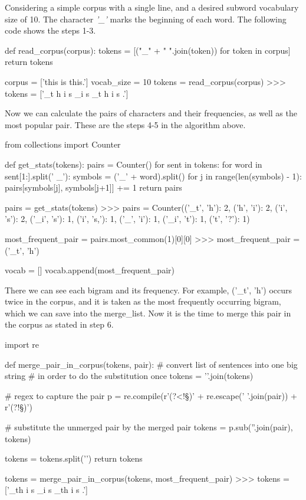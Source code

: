Considering a simple corpus with a single line, and a desired subword vocabulary size of 10. The character \emph{'\_'} marks the beginning of each word. The following code shows the steps 1-3.

\begin{python}
def read_corpus(corpus):
    tokens = [("_" + " ".join(token)) for token in corpus]
    return tokens

corpus = ['this is this.']
vocab_size = 10
tokens = read_corpus(corpus)
>>> tokens = ['_t h i s _i s _t h i s .']
\end{python}

Now we can calculate the pairs of characters and their frequencies, as well as the most popular pair. These are the steps 4-5 in the algorithm above.

\begin{python}
from collections import Counter

def get_stats(tokens):
    pairs = Counter()
    for sent in tokens:
        for word in sent[1:].split(' _'):
            symbols = ('_' + word).split()
            for j in range(len(symbols) - 1):
                pairs[symbols[j], symbols[j+1]] += 1
    return pairs

pairs = get_stats(tokens)
>>> pairs = Counter({('_t', 'h'): 2, ('h', 'i'): 2, ('i', 's'): 2, 
                    ('_i', 's'): 1, ('i', 's,'): 1, ('_', 'i'): 1, 
                    ('_i', 't'): 1, ('t', '?'): 1})

most_frequent_pair = pairs.most_common(1)[0][0]
>>> most_frequent_pair = ('_t', 'h')

vocab = []
vocab.append(most_frequent_pair)
\end{python}

There we can see each bigram and its frequency. For example, ('\_t', 'h') occurs twice in the corpus, and it is taken as the most frequently occurring bigram, which we can save into the merge\_list. Now it is the time to merge this pair in the corpus as stated in step 6.

\begin{python}
import re

def merge_pair_in_corpus(tokens, pair):
    # convert list of sentences into one big string
    # in order to do the substitution once
    tokens = '\n'.join(tokens)

    # regex to capture the pair
    p = re.compile(r'(?<!\S)' + re.escape(' '.join(pair)) + r'(?!\S)')

    # substitute the unmerged pair by the merged pair
    tokens = p.sub(''.join(pair), tokens)

    tokens = tokens.split('\n')
    return tokens

tokens = merge_pair_in_corpus(tokens, most_frequent_pair)
>>> tokens = ['_th i s _i s _th i s .']
\end{python}

